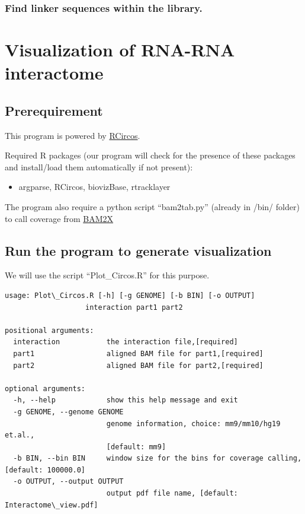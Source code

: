 \documentclass[letterpaper,10pt,english]{sphinxmanual}
\begin{document}
\subsection{Find linker sequences within the library.}
\label{Analysis_pipeline:find-linker-sequences-within-the-library}\label{Analysis_pipeline:find-linker}

\chapter{Visualization of RNA-RNA interactome}
\label{Visualization::doc}\label{Visualization:visualization-of-rna-rna-interactome}

\section{Prerequirement}
\label{Visualization:prerequirement}
This program is powered by \href{http://cran.r-project.org/web/packages/RCircos/index.html}{RCircos}.

Required R packages (our program will check for the presence of these packages and install/load them automatically if not present):
\begin{itemize}
\item {} 
argparse, RCircos, biovizBase, rtracklayer

\end{itemize}

The program also require a python script ``bam2tab.py'' (already in /bin/ folder) to call coverage from \href{https://github.com/nimezhu/bam2x/blob/master/scripts/bed2tab.py}{BAM2X}


\section{Run the program to generate visualization}
\label{Visualization:run-the-program-to-generate-visualization}
We will use the script ``Plot\_Circos.R'' for this purpose.

\begin{Verbatim}[commandchars=\\\{\}]
usage: Plot\_Circos.R [-h] [-g GENOME] [-b BIN] [-o OUTPUT]
                   interaction part1 part2

positional arguments:
  interaction           the interaction file,[required]
  part1                 aligned BAM file for part1,[required]
  part2                 aligned BAM file for part2,[required]

optional arguments:
  -h, --help            show this help message and exit
  -g GENOME, --genome GENOME
                        genome information, choice: mm9/mm10/hg19 et.al.,
                        [default: mm9]
  -b BIN, --bin BIN     window size for the bins for coverage calling, [default: 100000.0]
  -o OUTPUT, --output OUTPUT
                        output pdf file name, [default: Interactome\_view.pdf]
\end{Verbatim}
\end{document}
